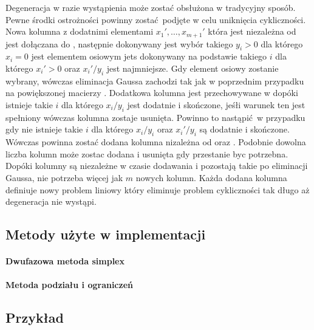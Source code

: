 \begin{enumerate}
Degeneracja w razie wystąpienia może zostać obsłużona w tradycyjny sposób. Pewne środki ostrożności powinny zostać podjęte w celu uniknięcia cykliczności. Nowa kolumna  z dodatnimi elementami $x_1',\dots,x_{m+1}'$ która jest niezależna od  jest dołączana do , następnie dokonywany jest wybór takiego $y_i > 0$ dla którego $x_i = 0$ jest elementem osiowym jets dokonywany na podstawie takiego $i$ dla którego $x_i' > 0$ oraz $x_i'/y_i$ jest najmniejsze. Gdy element osiowy zostanie wybrany, wówczas eliminacja Gaussa zachodzi tak jak w poprzednim przypadku na powiększonej macierzy . Dodatkowa kolumna jest przechowywane w  dopóki istnieje takie $i$ dla którego $x_i/y_i$ jest dodatnie i skończone, jeśłi warunek ten jest spełniony wówczas kolumna zostaje usunięta. Powinno to nastąpić w przypadku gdy nie istnieje takie $i$ dla którego $x_i/y_i$ oraz $x_i'/y_i$ są dodatnie i skończone. Wówczas powinna zostać dodana kolumna  nizależna od  oraz . Podobnie dowolna liczba kolumn może zostac dodana i usunięta gdy przestanie byc potrzebna. Dopóki kolumny są niezależne w czasie dodawania i pozostają takie po eliminacji Gaussa, nie potrzeba więcej jak $m$ nowych kolumn. Każda dodana kolumna definiuje nowy problem liniowy który eliminuje problem cykliczności tak długo aż degeneracja nie wystąpi.

\end{enumerate}

\subsection{Metody użyte w implementacji}

\paragraph{Dwufazowa metoda simplex}
\paragraph{Metoda podziału i ograniczeń}

\subsection{Przykład}
